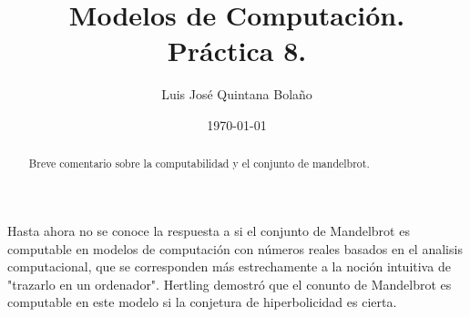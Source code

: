 \documentclass[a4paper]{article}
\title{Modelos de Computación.\\ Práctica 8. }
\author{Luis José Quintana Bolaño}
\date{\today}
\begin{document}
	\maketitle
	\begin{abstract}
	    Breve comentario sobre la computabilidad y el conjunto de mandelbrot.
  	\end{abstract}
	\section{}
		Hasta ahora no se conoce la respuesta a si el conjunto de Mandelbrot es computable en modelos de computación con números reales basados en el analisis computacional, que se corresponden más estrechamente a la noción intuitiva de "trazarlo en un ordenador". Hertling demostró que el conunto de Mandelbrot es computable en este modelo si la conjetura de hiperbolicidad es cierta. 
		
\end{document}
